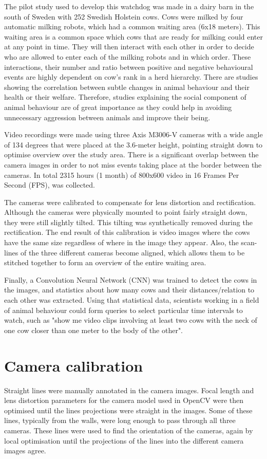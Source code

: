 \documentclass[10pt,a4paper,twocolumn]{article}
\begin{document}
The pilot study used to develop this watchdog was made in a dairy barn in the south of Sweden with 252 Swedish Holstein cows. Cows were milked by four automatic milking robots, which had a common waiting area (6x18 meters). This waiting area is a common space which cows that are ready for milking could enter at any point in time. They will then interact with each other  in order to decide who are allowed to enter each of the milking robots and in which order. These interactions, their number and ratio between positive and negative behavioural events are highly dependent on cow's rank in a herd hierarchy. There are studies showing the correlation between subtle changes in animal behaviour and their health or their welfare. Therefore, studies explaining the social component of animal behaviour are of great importance as they could help in avoiding unnecessary aggression between animals and improve their being.

Video recordings were made using three Axis M3006-V cameras with a wide angle of 134 degrees that were placed at the 3.6-meter height, pointing straight down to optimise overview over the study area. There is a significant overlap between the camera images in order to not miss events taking place at the border between the cameras. In total 2315 hours (1 month) of 800x600 video in 16 Frames Per Second (FPS), was collected.

The cameras were calibrated to compensate for lens distortion and rectification. Although the cameras were physically mounted to point fairly straight down, they were still slightly tilted. This tilting was synthetically removed during the rectification. The end result of this calibration is video images where the cows have the same size regardless of where in the image they appear. Also, the scan-lines of the three different cameras become aligned, which allows them to be stitched together to form an overview of the entire waiting area.

Finally, a Convolution Neural Network (CNN)  was trained to detect the cows in the images, and statistics about how many cows and their distances/relation to each other was extracted. Using that statistical data, scientists working in a field of animal behaviour could form queries to select particular time intervals to watch, such as "show me video clips involving at least two cows with the neck of one cow closer than one meter to the body of the other".

\section{Camera calibration}
Straight lines were manually annotated in the camera images. Focal length and lens distortion parameters for the camera model used in OpenCV were then  optimised until the lines projections were straight in the images. Some of these lines, typically from the walls, were long enough to pass through all three cameras. These lines were used to find the orientation of the cameras, again by local optimisation until the projections of the lines into the different camera images agree.
\end{document}
